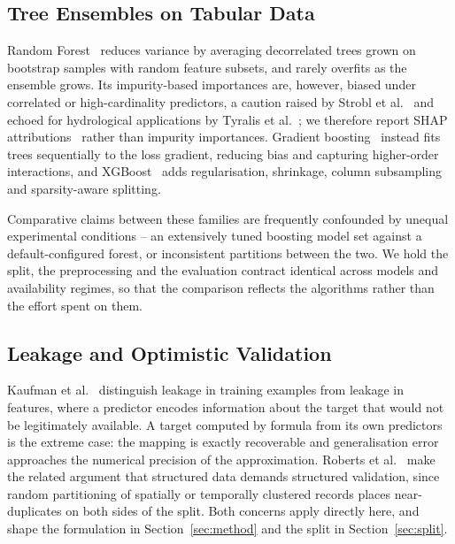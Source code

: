 \subsection{Tree Ensembles on Tabular Data}
Random Forest~\cite{breiman2001randomforests} reduces variance by averaging decorrelated
trees grown on bootstrap samples with random feature subsets, and rarely overfits as the
ensemble grows. Its impurity-based importances are, however, biased under correlated or
high-cardinality predictors, a caution raised by Strobl et al.~\cite{strobl2007} and
echoed for hydrological applications by Tyralis et al.~\cite{tyralis2019}; we therefore
report SHAP attributions~\cite{lundberg2017shap} rather than impurity importances.
Gradient boosting~\cite{friedman2001gradient} instead fits trees sequentially to the loss
gradient, reducing bias and capturing higher-order interactions, and
XGBoost~\cite{chen2016xgboost} adds regularisation, shrinkage, column subsampling and
sparsity-aware splitting.

Comparative claims between these families are frequently confounded by unequal
experimental conditions -- an extensively tuned boosting model set against a
default-configured forest, or inconsistent partitions between the two. We hold the split,
the preprocessing and the evaluation contract identical across models and availability
regimes, so that the comparison reflects the algorithms rather than the effort spent on
them.

\subsection{Leakage and Optimistic Validation}
Kaufman et al.~\cite{kaufman2012leakage} distinguish leakage in training examples from
leakage in features, where a predictor encodes information about the target that would
not be legitimately available. A target computed by formula from its own predictors is
the extreme case: the mapping is exactly recoverable and generalisation error approaches
the numerical precision of the approximation. Roberts et al.~\cite{roberts2017cv} make
the related argument that structured data demands structured validation, since random
partitioning of spatially or temporally clustered records places near-duplicates on both
sides of the split. Both concerns apply directly here, and shape the formulation in
Section~\ref{sec:method} and the split in Section~\ref{sec:split}.
